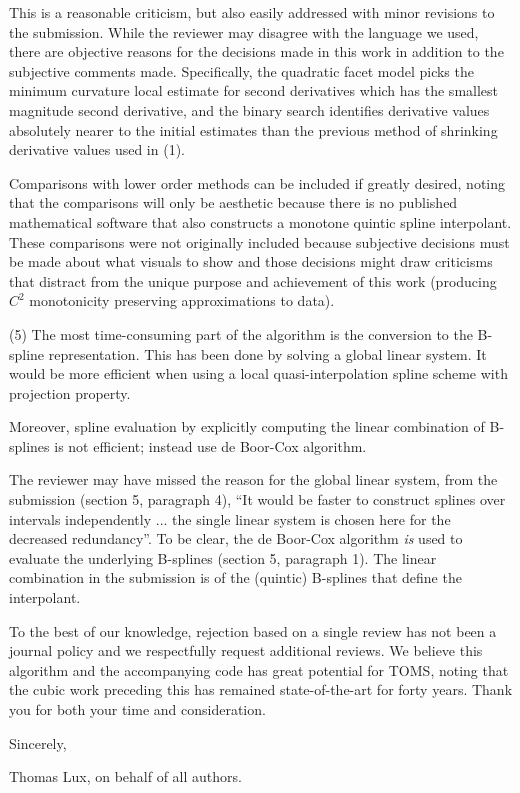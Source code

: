 This is a reasonable criticism, but also easily addressed with minor revisions to the submission. While the reviewer may disagree with the language we used, there are objective reasons for the decisions made in this work in addition to the subjective comments made. Specifically, the quadratic facet model picks the minimum curvature local estimate for second derivatives which has the smallest magnitude second derivative, and the binary search identifies derivative values absolutely nearer to the initial estimates than the previous method of shrinking derivative values used in (1).

Comparisons with lower order methods can be included if greatly desired, noting that the comparisons will only be aesthetic because there is no published mathematical software that also constructs a monotone quintic spline interpolant. These comparisons were not originally included because subjective decisions must be made about what visuals to show and those decisions might draw criticisms that distract from the unique purpose and achievement of this work (producing $C^2$ monotonicity preserving approximations to data).

{\parindent=20pt \it

\item{(5)} The most time-consuming part of the algorithm is the conversion to the B-spline representation. This has been done by solving a global linear system. It would be more efficient when using a local quasi-interpolation spline scheme with projection property.

\item{} Moreover, spline evaluation by explicitly computing the linear combination of B-splines is not efficient; instead use de Boor-Cox algorithm.

}

The reviewer may have missed the reason for the global linear system, from the submission (section 5, paragraph 4), ``It would be faster to construct splines over intervals independently ... the single linear system is chosen here for the decreased redundancy''. To be clear, the de Boor-Cox algorithm {\it is} used to evaluate the underlying B-splines (section 5, paragraph 1). The linear combination in the submission is of the (quintic) B-splines that define the interpolant.

\bigskip

To the best of our knowledge, rejection based on a single review has not been a journal policy and we respectfully request additional reviews. We believe this algorithm and the accompanying code has great potential for TOMS, noting that the cubic work preceding this has remained state-of-the-art for forty years. Thank you for both your time and consideration.

Sincerely,

Thomas Lux, on behalf of all authors.

\bye


